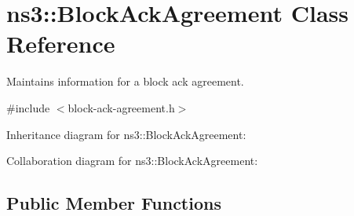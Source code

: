 \hypertarget{classns3_1_1BlockAckAgreement}{}\section{ns3\+:\+:Block\+Ack\+Agreement Class Reference}
\label{classns3_1_1BlockAckAgreement}


Maintains information for a block ack agreement.  




{\ttfamily \#include $<$block-\/ack-\/agreement.\+h$>$}



Inheritance diagram for ns3\+:\+:Block\+Ack\+Agreement\+:


Collaboration diagram for ns3\+:\+:Block\+Ack\+Agreement\+:
\subsection*{Public Member Functions}
